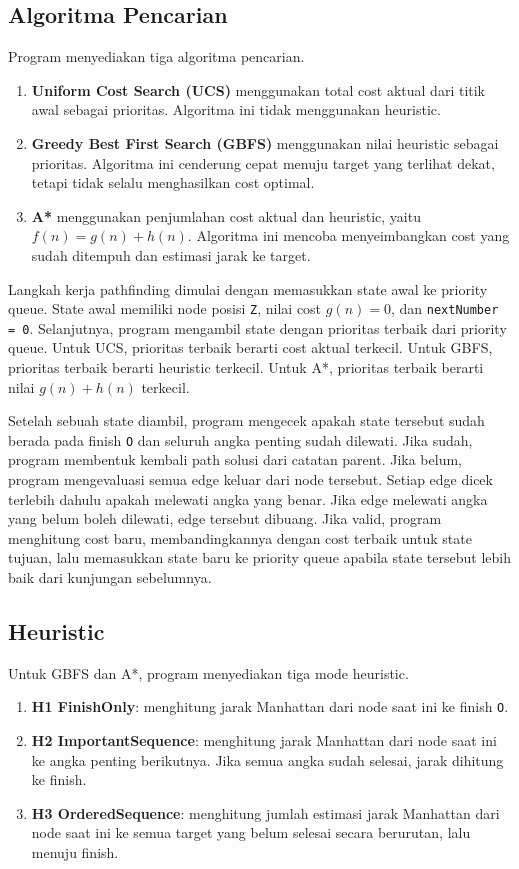 \documentclass[a4paper,11pt]{article}
\begin{document}
\subsection{Algoritma Pencarian}
Program menyediakan tiga algoritma pencarian.

\begin{enumerate}
    \item \textbf{Uniform Cost Search (UCS)} menggunakan total cost aktual dari titik awal sebagai prioritas. Algoritma ini tidak menggunakan heuristic.
    \item \textbf{Greedy Best First Search (GBFS)} menggunakan nilai heuristic sebagai prioritas. Algoritma ini cenderung cepat menuju target yang terlihat dekat, tetapi tidak selalu menghasilkan cost optimal.
    \item \textbf{A*} menggunakan penjumlahan cost aktual dan heuristic, yaitu $f(n) = g(n) + h(n)$. Algoritma ini mencoba menyeimbangkan cost yang sudah ditempuh dan estimasi jarak ke target.
\end{enumerate}

Langkah kerja pathfinding dimulai dengan memasukkan state awal ke priority queue. State awal memiliki node posisi \texttt{Z}, nilai cost $g(n) = 0$, dan \texttt{nextNumber = 0}. Selanjutnya, program mengambil state dengan prioritas terbaik dari priority queue. Untuk UCS, prioritas terbaik berarti cost aktual terkecil. Untuk GBFS, prioritas terbaik berarti heuristic terkecil. Untuk A*, prioritas terbaik berarti nilai $g(n) + h(n)$ terkecil.

Setelah sebuah state diambil, program mengecek apakah state tersebut sudah berada pada finish \texttt{O} dan seluruh angka penting sudah dilewati. Jika sudah, program membentuk kembali path solusi dari catatan parent. Jika belum, program mengevaluasi semua edge keluar dari node tersebut. Setiap edge dicek terlebih dahulu apakah melewati angka yang benar. Jika edge melewati angka yang belum boleh dilewati, edge tersebut dibuang. Jika valid, program menghitung cost baru, membandingkannya dengan cost terbaik untuk state tujuan, lalu memasukkan state baru ke priority queue apabila state tersebut lebih baik dari kunjungan sebelumnya.

\subsection{Heuristic}
Untuk GBFS dan A*, program menyediakan tiga mode heuristic.

\begin{enumerate}
    \item \textbf{H1 FinishOnly}: menghitung jarak Manhattan dari node saat ini ke finish \texttt{O}.
    \item \textbf{H2 ImportantSequence}: menghitung jarak Manhattan dari node saat ini ke angka penting berikutnya. Jika semua angka sudah selesai, jarak dihitung ke finish.
    \item \textbf{H3 OrderedSequence}: menghitung jumlah estimasi jarak Manhattan dari node saat ini ke semua target yang belum selesai secara berurutan, lalu menuju finish.
\end{enumerate}
\end{document}
